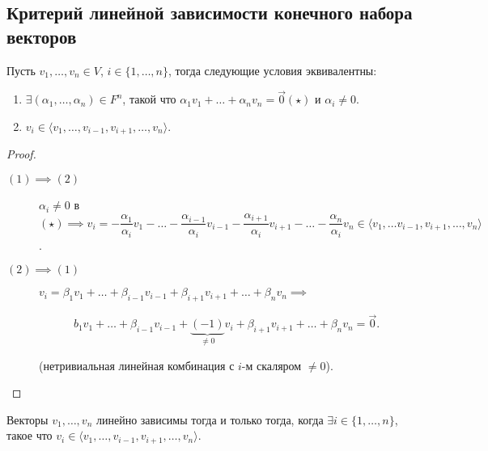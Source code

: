\subsection{Критерий линейной зависимости конечного набора векторов}

\begin{proposal}
    \label{lec11:proposal_a_i}
    Пусть $v_1, \dots, v_n \in V$, $i \in \{1, \dots, n\}$, тогда следующие условия эквивалентны:
    \begin{enumerate}
        \item $\exists (\alpha_1, \dots, \alpha_n) \in F^n$, такой что $\alpha_1 v_1 + \dots + \alpha_n v_n = \overrightarrow{0} (\star) $ и $\alpha_i \neq 0$. 
        \item $v_i \in \langle v_1, \dots, v_{i - 1}, v_{i + 1}, \dots, v_n \rangle$.
    \end{enumerate}
\end{proposal}

\begin{proof}~
    \begin{description}
        \item[$(1) \implies (2)$] $\alpha_i \neq 0$ в $(\star) \implies v_i = -\dfrac{\alpha_1}{\alpha_i} v_1 - \dots - \dfrac{\alpha_{i - 1}}{\alpha_i} v_{i - 1} - \dfrac{\alpha_{i + 1}}{\alpha_i} v_{i + 1} - \dots - \dfrac{\alpha_n}{\alpha_i} v_n \in \langle v_1, \dots v_{i - 1}, v_{i + 1}, \dots, v_n \rangle$.
        \item[$(2) \implies (1)$] 
            $v_i = \beta_1 v_1 + \dots + \beta_{i - 1} v_{i - 1} + \beta_{i + 1} v_{i + 1} + \dots + \beta_n v_n \implies $
            
            \begin{equation*}
                b_1 v_1 + \dots + \beta_{i - 1} v_{i - 1} + \underbrace{(-1)}_{\neq 0} v_i + \beta_{i + 1} v_{i + 1} + \dots + \beta_n v_n = \overrightarrow{0}
            .\end{equation*}

            (нетривиальная линейная комбинация с $i$-м скаляром $\neq 0$). \qedhere
    \end{description}
\end{proof}

\begin{corollary}
    Векторы $v_1, \dots, v_n$ линейно зависимы тогда и только тогда, когда $\exists i \in \{1, \dots, n\}$, такое что $v_i \in \langle v_1, \dots, v_{i - 1}, v_{i + 1}, \dots, v_n \rangle$.
\end{corollary}



